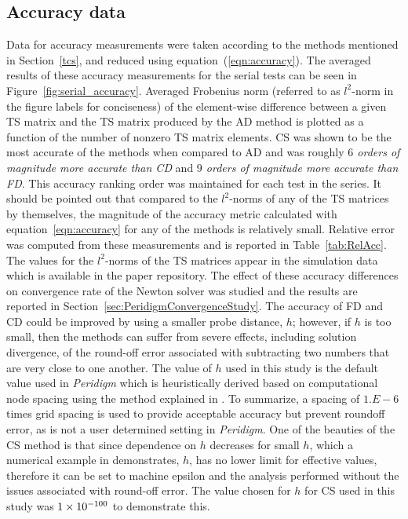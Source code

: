\documentclass[preprint,12pt]{elsarticle}
\begin{document}
\subsection{Accuracy data}
%
Data for accuracy measurements were taken according to the methods mentioned in Section~\ref{tcs}, and reduced using equation~(\ref{eqn:accuracy}). The averaged results of these accuracy measurements for the serial tests can be seen in Figure~\ref{fig:serial_accuracy}. Averaged Frobenius norm (referred to as $l^2$-norm in the figure labels for conciseness) of the element-wise difference between a given TS matrix and the TS matrix produced by the AD method is plotted as a function of the number of nonzero TS matrix elements. CS was shown to be the most accurate of the methods when compared to AD and was roughly \emph{$6$ orders of magnitude more accurate than CD} and \emph{$9$ orders of magnitude more accurate than FD}. This accuracy ranking order was maintained for each test in the series. It should be pointed out that compared to the $l^2$-norms of any of the TS matrices by themselves, the magnitude of the accuracy metric calculated with equation~\ref{eqn:accuracy} for any of the methods is relatively small. Relative error was computed from these measurements and is reported in Table~\ref{tab:RelAcc}. The values for the $l^2$-norms of the TS matrices appear in the simulation data which is available in the paper repository. The effect of these accuracy differences on convergence rate of the Newton solver was studied and the results are reported in Section~\ref{sec:PeridigmConvergenceStudy}.  
%
The accuracy of FD and CD could be improved by using a smaller probe distance, $h$; however, if $h$ is too small, then the methods can suffer from severe effects, including solution divergence, of the round-off error associated with subtracting two numbers that are very close to one another.  The value of $h$ used in this study is the default value used in \emph{Peridigm} which is heuristically derived based on computational node spacing using the method explained in \cite[pp. 90]{ref-Adaggio}.  To summarize, a spacing of $1.E-6$ times grid spacing is used to provide acceptable accuracy but prevent roundoff error, as is not a user determined setting in \emph{Peridigm}. One of the beauties of the CS method is that since dependence on $h$ decreases for small $h$, which a numerical example in \cite[Table 1]{squire1998using} demonstrates, $h$, has no lower limit for effective values, therefore it can be set to machine epsilon and the analysis performed without the issues associated with round-off error. The value chosen for $h$ for CS used in this study was $\num{1.E-100}$ to demonstrate this.
\end{document}
